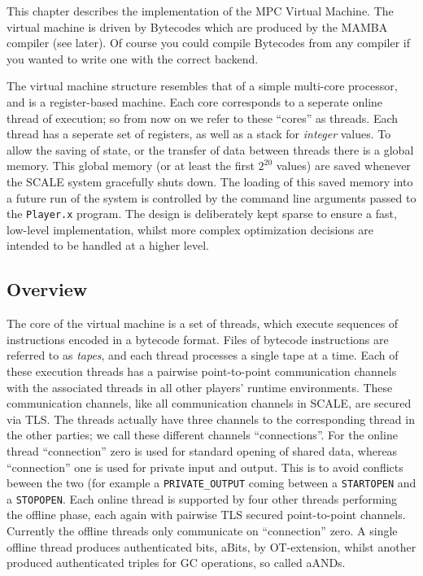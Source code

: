 
\label{ch:vm}

This chapter describes the implementation of the
MPC Virtual Machine. 
The virtual machine is driven by Bytecodes which
are produced by the MAMBA compiler (see later).
Of course you could compile Bytecodes from any compiler
if you wanted to write one with the correct backend.

The virtual machine structure resembles that of a
simple multi-core processor, and is a register-based
machine.
Each core corresponds to a seperate online thread
of execution; so from now on we refer to these ``cores''
as threads.
Each thread has a seperate set of registers, as
well as a stack for {\em integer} values.
To allow the saving of state, or the transfer of data
between threads there is a global memory.
This global memory (or at least the first $2^{20}$
values) are saved whenever the SCALE system gracefully
shuts down.
The loading of this saved memory into a future run of the
system is controlled by the command line arguments
passed to the \verb+Player.x+ program.
The design is deliberately kept sparse to ensure a fast, low-level 
implementation, whilst more complex optimization decisions are intended 
to be handled at a higher level.

\subsection{Overview}

The core of the virtual machine is a set of threads, which
execute sequences of instructions encoded in a bytecode format.
Files of bytecode instructions are referred to as \emph{tapes},
and each thread processes a single tape at a time.
Each of these execution threads has a pairwise point-to-point
communication channels with the associated threads in all
other players' runtime environments.
These communication channels, like all communication channels
in SCALE, are secured via TLS.
The threads actually have three channels to the corresponding
thread in the other parties; we call these different channels
``connections''.
For the online thread ``connection'' zero is used for standard
opening of shared data, whereas ``connection'' one is used for
private input and output. This is to avoid conflicts beween
the two (for example a \verb+PRIVATE_OUTPUT+ coming between
a \verb+STARTOPEN+ and a \verb+STOPOPEN+.
Each online thread is supported by four other threads
performing the offline phase, each again with pairwise 
TLS secured point-to-point channels. Currently the offline
threads only communicate on ``connection'' zero.
A single offline thread produces authenticated bits, aBits,
by OT-extension, whilst another produced authenticated 
triples for GC operations, so called aANDs.

